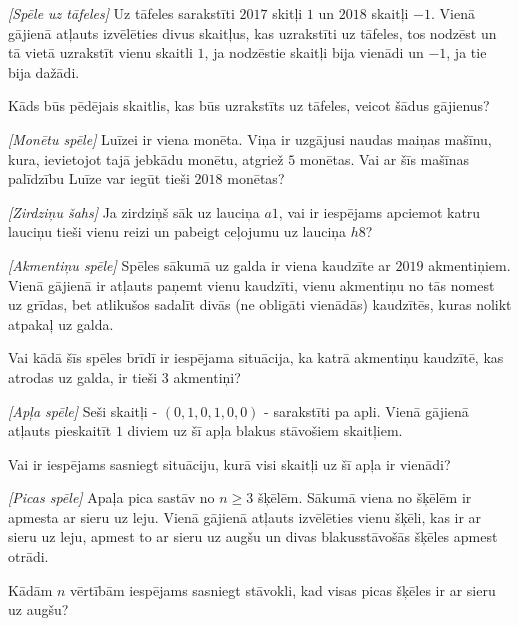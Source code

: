 






\noindent 



\begin{problem}
\textit{[Spēle uz tāfeles]}
Uz tāfeles sarakstīti $2017$ skitļi $1$ un $2018$ skaitļi $-1$. Vienā gājienā atļauts izvēlēties divus skaitļus, kas uzrakstīti uz tāfeles, tos nodzēst un tā vietā uzrakstīt vienu skaitli $1$, ja nodzēstie skaitļi bija vienādi un $-1$, ja tie bija dažādi.

Kāds būs pēdējais skaitlis, kas būs uzrakstīts uz tāfeles, veicot šādus gājienus?

\end{problem}
%

\begin{problem}
\textit{[Monētu spēle]}
Luīzei ir viena monēta. Viņa ir uzgājusi naudas maiņas mašīnu, kura, ievietojot tajā jebkādu monētu, atgriež $5$ monētas.
Vai ar šīs mašīnas palīdzību Luīze var iegūt tieši $2018$ monētas?
\end{problem}
%

\begin{problem}
\textit{[Zirdziņu šahs]}
Ja zirdziņš sāk uz lauciņa $a1$, vai ir iespējams apciemot katru lauciņu tieši vienu reizi un pabeigt ceļojumu uz lauciņa $h8$?
\end{problem}
%

\begin{problem}
\textit{[Akmentiņu spēle]}
Spēles sākumā uz galda ir viena kaudzīte ar $2019$ akmentiņiem. Vienā gājienā ir atļauts paņemt vienu kaudzīti, vienu akmentiņu no tās nomest uz grīdas, bet atlikušos sadalīt divās (ne obligāti vienādās) kaudzītēs, kuras nolikt atpakaļ uz galda. 

Vai kādā šīs spēles brīdī ir iespējama situācija, ka katrā akmentiņu kaudzītē, kas atrodas uz galda, ir tieši $3$ akmentiņi?
\end{problem}
%

\begin{problem}
\textit{[Apļa spēle]}
Seši skaitļi - $(0,1,0,1,0,0)$ - sarakstīti pa apli. Vienā gājienā atļauts pieskaitīt $1$ diviem uz šī apļa blakus stāvošiem skaitļiem.

Vai ir iespējams sasniegt situāciju, kurā visi skaitļi uz šī apļa ir vienādi?
\end{problem}
%

\begin{problem}
\textit{[Picas spēle]}
Apaļa pica sastāv no  $n\ge3$ šķēlēm. Sākumā viena no šķēlēm ir apmesta ar sieru uz leju. Vienā gājienā atļauts izvēlēties vienu šķēli, kas ir ar sieru uz leju, apmest to ar sieru uz augšu un divas blakusstāvošās šķēles apmest otrādi.

Kādām $n$ vērtībām iespējams sasniegt stāvokli, kad visas picas šķēles ir ar sieru uz augšu?
\end{problem}
%


